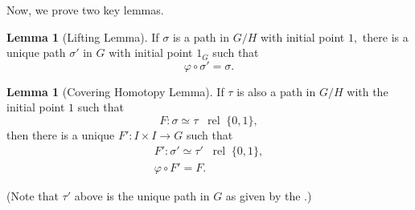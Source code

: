 \documentclass[12pt]{article}
\theoremstyle{definition}
\numberwithin{thm}{section}
\newtheorem{lem}[thm]{Lemma}
\newcommand{\rel}{\;\;\operatorname{rel}\;}
\begin{document}
Now, we prove two key lemmas. 
\begin{lem}[Lifting Lemma] \label{lem:lift}
	If $\sigma$ is a path in $G/H$ with initial point $1,$ there is a unique path $\sigma'$ in $G$ with initial point $1_G$ such that
	\begin{equation*} 
		\varphi \circ \sigma' = \sigma.
	\end{equation*}
\end{lem}
\begin{lem}[Covering Homotopy Lemma] \label{lem:covhomot}
	If $\tau$ is also a path in $G/H$ with the initial point $1$ such that
	\begin{equation*} 
		F: \sigma \simeq \tau \rel \{0, 1\},
	\end{equation*}
	then there is a unique $F':I\times I \to G$ such that
	\begin{align*} 
		F' : \sigma' \simeq \tau' \rel \{0, 1\},\\
		\varphi \circ F' = F.
	\end{align*}
\end{lem}
(Note that $\tau'$ above is the unique path in $G$ as given by the .)
\end{document}
